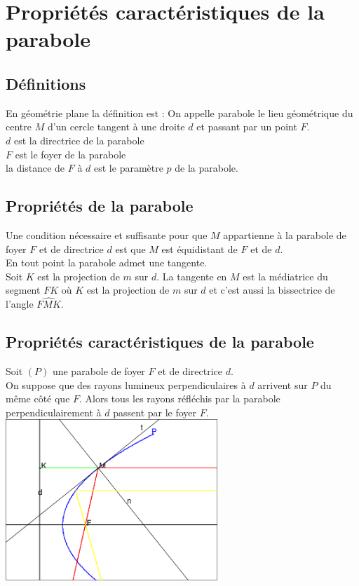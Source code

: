 \documentclass[a4paper,11pt]{book}
\begin{document}
\section{Propri\'et\'es caract\'eristiques de la parabole}
\subsection{D\'efinitions}
En g\'eom\'etrie plane la d\'efinition est :
On appelle parabole le lieu g\'eom\'etrique du centre $M$ d'un cercle tangent 
\`a une droite $d$ et passant par un point $F$.\\
$d$ est la directrice de la parabole\\
$F$ est le foyer de la parabole\\
la distance de $F$ \`a $d$ est le param\`etre $p$ de la parabole.
\subsection{Propri\'et\'es de la parabole}
Une condition n\'ecessaire et suffisante pour que $M$ appartienne \`a la 
parabole de foyer $F$ et de directrice $d$ est que $M$ est \'equidistant de $F$
 et de $d$.\\
En tout point la parabole admet une tangente.\\
Soit $K$ est la projection de $m$ sur $d$. La tangente en $M$ est la 
m\'ediatrice du segment $FK$ o\`u $K$ est la projection de $m$ sur $d$ et c'est
 aussi la bissectrice de l'angle $\widehat{FMK}$.
\subsection{Propri\'et\'es caract\'eristiques de la parabole}
Soit $(P)$ une parabole de foyer $F$ et de directrice $d$.\\
On suppose que des rayons lumineux  perpendiculaires \`a $d$ arrivent sur $P$ 
du m\^eme c\^ot\'e que $F$.
Alors tous les rayons r\'efl\'echis par la parabole perpendiculairement \`a $d$
passent par le foyer $F$.\\
\includegraphics[width=8cm]{parabole}\\
\end{document}
